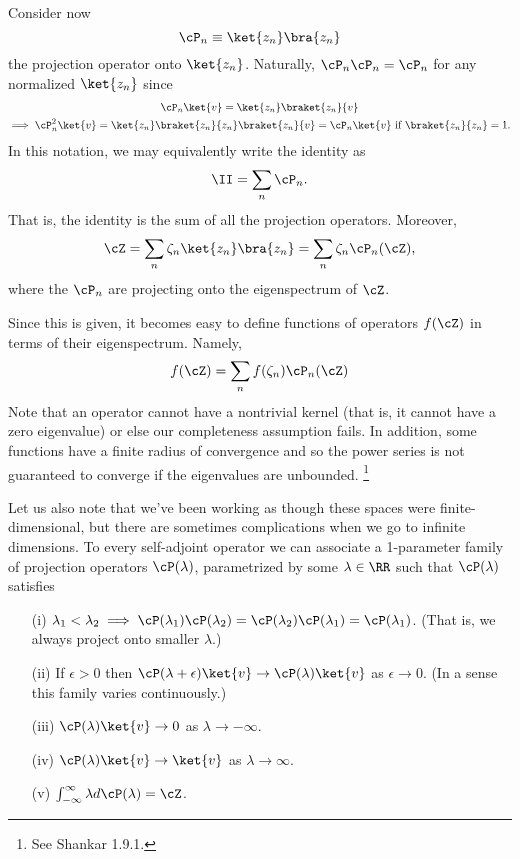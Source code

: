 Consider now
\begin{equation}
    \cP_n \equiv \ket{z_n}\bra{z_n}
\end{equation}
the projection operator onto $\ket{z_n}$. Naturally, $\cP_n \cP_n=\cP_n$ for any normalized $\ket{z_n}$ since
\begin{gather*}
    \cP_n \ket{v} = \ket{z_n} \braket{z_n}{v}\\
    \implies \cP_n^2 \ket{v} = \ket{z_n}\braket{z_n}{z_n}\braket{z_n}{v} = \cP_n \ket{v} \text{ if }\braket{z_n}{z_n}=1.
\end{gather*}
In this notation, we may equivalently write the identity as
\begin{equation}
    \II = \sum_n \cP_n.
\end{equation}
That is, the identity is the sum of all the projection operators. Moreover,
\begin{equation}
    \cZ = \sum_n \zeta_n \ket{z_n}\bra{z_n} = \sum_n \zeta_n \cP_n(\cZ),
\end{equation}
where the $\cP_n$ are projecting onto the eigenspectrum of $\cZ$.

Since this is given, it becomes easy to define functions of operators $f(\cZ)$ in terms of their eigenspectrum. Namely,
\begin{equation}
    f(\cZ)=\sum_n f(\zeta_n) \cP_n(\cZ)
\end{equation}
Note that an operator cannot have a nontrivial kernel (that is, it cannot have a zero eigenvalue) or else our completeness assumption fails. In addition, some functions have a finite radius of convergence and so the power series is not guaranteed to converge if the eigenvalues are unbounded.%
    \footnote{See Shankar 1.9.1.}

Let us also note that we've been working as though these spaces were finite-dimensional, but there are sometimes complications when we go to infinite dimensions. To every self-adjoint operator we can associate a 1-parameter family of projection operators $\cP(\lambda)$, parametrized by some $\lambda\in \RR$ such that $\cP(\lambda)$ satisfies
\begin{enumerate}
    \item[(i)] $\lambda_1 <\lambda_2 \implies \cP(\lambda_1) \cP(\lambda_2) = \cP(\lambda_2) \cP(\lambda_1) = \cP(\lambda_1)$. (That is, we always project onto smaller $\lambda$.)
    \item[(ii)] If $\epsilon>0$ then $\cP(\lambda+\epsilon)\ket{v} \to \cP(\lambda)\ket{v}$ as $\epsilon\to 0$. (In a sense this family varies continuously.)
    \item[(iii)] $\cP(\lambda)\ket{v}\to 0$ as $\lambda \to -\infty$.
    \item[(iv)] $\cP(\lambda)\ket{v}\to \ket{v}$ as $\lambda\to \infty$.
    \item[(v)] $\int_{-\infty}^\infty \lambda d\cP(\lambda)=\cZ$.
\end{enumerate}

